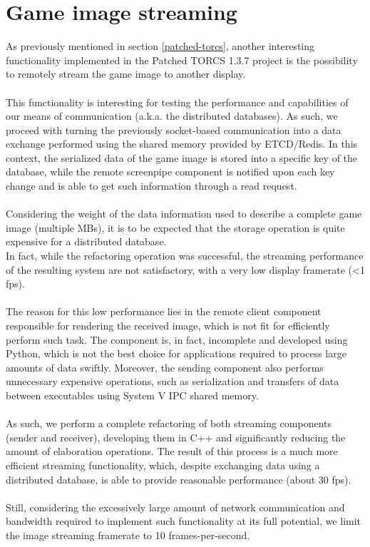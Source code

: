 \section{Game image streaming}
As previously mentioned in section \ref{patched-torcs}, another interesting functionality implemented in the Patched TORCS 1.3.7 project is the possibility to remotely stream the game image to another display. \\ \\
This functionality is interesting for testing the performance and capabilities of our means of communication (a.k.a. the distributed databases). As such, we proceed with turning the previously socket-based communication into a data exchange performed using the shared memory provided by ETCD/Redis. In this context, the serialized data of the game image is stored into a specific key of the database, while the remote screenpipe component is notified upon each key change and is able to get such information through a read request. \\ \\
Considering the weight of the data information used to describe a complete game image (multiple MBs), it is to be expected that the storage operation is quite expensive for a distributed database. \\
In fact, while the refactoring operation was successful, the streaming performance of the resulting system are not satisfactory, with a very low display framerate (<1 fps). \\ \\
The reason for this low performance lies in the remote client component responsible for rendering the received image, which is not fit for efficiently perform such task. The component is, in fact, incomplete and developed using Python, which is not the best choice for applications required to process large amounts of data swiftly. Moreover, the sending component also performs unnecessary expensive operations, such as serialization and transfers of data between executables using System V IPC shared memory. \\ \\
As such, we perform a complete refactoring of both streaming components (sender and receiver), developing them in C++ and significantly reducing the amount of elaboration operations. The result of this process is a much more efficient streaming functionality, which, despite exchanging data using a distributed database, is able to provide reasonable performance (about 30 fps). \\ \\
Still, considering the excessively large amount of network communication and bandwidth required to implement such functionality at its full potential, we limit the image streaming framerate to 10 frames-per-second.

